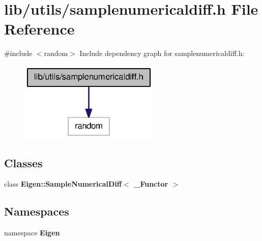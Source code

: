 \section{lib/utils/samplenumericaldiff.h \-File \-Reference}
\label{samplenumericaldiff_8h}
{\ttfamily \#include $<$random$>$}\*
\-Include dependency graph for samplenumericaldiff.\-h\-:
\nopagebreak
\begin{figure}[H]
\begin{center}
\leavevmode
\includegraphics[width=190pt]{samplenumericaldiff_8h__incl}
\end{center}
\end{figure}
\subsection*{\-Classes}
\begin{DoxyCompactItemize}
\item 
class {\bf \-Eigen\-::\-Sample\-Numerical\-Diff$<$ \-\_\-\-Functor $>$}
\end{DoxyCompactItemize}
\subsection*{\-Namespaces}
\begin{DoxyCompactItemize}
\item 
namespace {\bf \-Eigen}
\end{DoxyCompactItemize}
